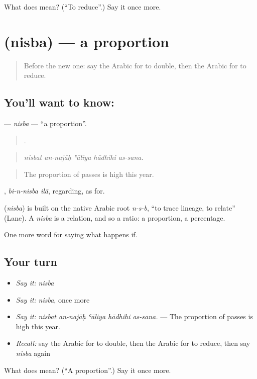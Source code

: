 \begin{tcolorbox}[breakable,colback=teal!4,colframe=teal!35!black,title={Before you move on}]
What does  mean? (\textquotedblleft{}To reduce\textquotedblright{}.) Say it once more.
\end{tcolorbox}
\section[\texorpdfstring{\ar{نسبة} (nisba)}{نسبة (nisba)}]{ (nisba) — a proportion}

\label{lesson:AR-C412-nisba}



\begin{quote}
Before the new one: say the Arabic for to double, then the Arabic for to reduce.
\end{quote}

\subsection*{You'll want to know: }
\textbf{} — \emph{nisba} — \textquotedblleft{}a proportion\textquotedblright{}.

\begin{quote}
    .
\end{quote}

\begin{quote}
\emph{nisbat an-najāḥ ʿāliya hādhihi as-sana.}
\end{quote}

\begin{quote}
The proportion of passes is high this year.
\end{quote}

 , \emph{bi-n-nisba ilā}, regarding, as for.

\begin{cousinweb}
\textbf{} (\emph{nisba}) is built on the native Arabic root \emph{n-s-b}, \textquotedblleft{}to trace lineage, to relate\textquotedblright{} (Lane). A \emph{nisba} is a relation, and so a ratio: a proportion, a percentage.
\end{cousinweb}

\begin{grammarlens}[title={What you've built}]
One more word for saying what happens if.
\end{grammarlens}

\subsection*{Your turn}
\begin{itemize}
\raggedright
  \item \emph{Say it:} \emph{nisba}
  \item \emph{Say it:} \emph{nisba}, once more
  \item \emph{Say it:} \emph{nisbat an-najāḥ ʿāliya hādhihi as-sana.} — The proportion of passes is high this year.
  \item \emph{Recall:} say the Arabic for to double, then the Arabic for to reduce, then say \emph{nisba} again
\end{itemize}

\begin{tcolorbox}[breakable,colback=teal!4,colframe=teal!35!black,title={Before you move on}]
What does  mean? (\textquotedblleft{}A proportion\textquotedblright{}.) Say it once more.
\end{tcolorbox}
